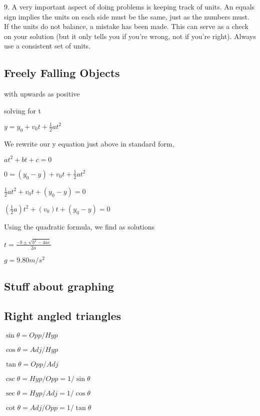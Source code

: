 \documentclass{extarticle}
\begin{document}
\begin{tcolorbox}[enhanced jigsaw,sharp corners,coltext=black,colback=BurntOrange!25!white,boxrule=0pt,breakable,size=minimal]
9. A very important aspect of doing problems is keeping track of units. An equals sign implies the units on each side must be the same, just as the numbers must. If the units do not balance, a mistake has been made. This can serve as a check on your solution (but it only tells you if you’re wrong, not if you’re right). Always use a consistent set of units.





\end{tcolorbox}


\subsection{Freely Falling Objects}

with upwards as positive

solving for t

$y = y_0 + v_0t + \frac{1}{2}at^2$

We rewrite our y equation just above in standard form,

$at^2 + bt + c = 0$

$0 = (y_0 - y) + v_0t + \frac{1}{2}at^2$

$\frac{1}{2}at^2 + v_0t + (y_0 - y) = 0$

$(\frac{1}{2}a)t^2 + (v_0)t + (y_0 - y) = 0$

Using the quadratic formula, we find as solutions

$t=\frac{-b\pm\sqrt{b^2-4ac}}{2a}$

$g = 9.80 m/s^2$

\begin{tcolorbox}[enhanced jigsaw,sharp corners,coltext=black,colback=BurntOrange!25!white,boxrule=0pt,breakable,size=minimal]


\subsection{Stuff about graphing}


\subsection{Right angled triangles}

$\sin\theta=Opp/Hyp$
	
$\cos\theta=Adj/Hyp$	
	
$\tan\theta=Opp/Adj$	


$\csc\theta=Hyp/Opp=1/\sin\theta$

$\sec\theta=Hyp/Adj=1/\cos\theta$

$\cot\theta=Adj/Opp=1/\tan\theta$

\end{tcolorbox}
\end{document}
